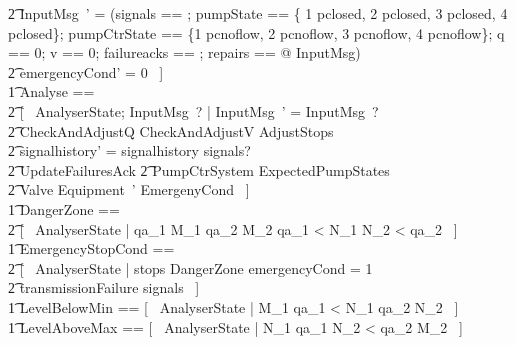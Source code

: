 \documentclass{report} %
\begin{document}
\begin{circus}
        \t2 \theta InputMsg~' = (\LET signals == \emptyset[InputSignal]; pumpState == \{ 1 \mapsto pclosed, 2 \mapsto pclosed, 3 \mapsto pclosed, 4 \mapsto pclosed\}; pumpCtrState == \{1 \mapsto pcnoflow, 2 \mapsto pcnoflow, 3 \mapsto pcnoflow, 4 \mapsto pcnoflow\}; q == 0; v == 0; failureacks == \emptyset[UnitFailure]; repairs == \emptyset[UnitFailure] @ \theta InputMsg) \\
        \t2 \land emergencyCond' = 0 ~] \\
    \t1 Analyse == \\
        \t2 [~ \Delta AnalyserState; InputMsg~? | \theta InputMsg~' = \theta InputMsg~? \land \\
        \t2 CheckAndAdjustQ \land CheckAndAdjustV \land AdjustStops \land \\
        \t2 signalhistory' = signalhistory \cup signals? \land \\
        \t2 UpdateFailuresAck \land 
        \t2 \Xi PumpCtrSystem \land \Xi ExpectedPumpStates \land \\ %
        \t2 \Xi Valve \land Equipment~' \land \Xi EmergenyCond ~] \\
    \t1 DangerZone == \\
        \t2 [~ AnalyserState | qa\_1 \geq M\_1 \land qa\_2 \leq M\_2 \implies qa\_1 < N\_1 \land N\_2 < qa\_2 ~] \\ %
    \t1 EmergencyStopCond == \\
        \t2 [~ AnalyserState | stops  \lor DangerZone \lor emergencyCond = 1 \lor \\
            \t2 transmissionFailure \in signals ~] \\
    \t1 LevelBelowMin == [~ AnalyserState | M\_1 \leq qa\_1 < N\_1 \land qa\_2 \leq N\_2 ~] \\
    \t1 LevelAboveMax == [~ AnalyserState | N\_1 \leq qa\_1 \land N\_2 < qa\_2 \leq M\_2 ~] \\

\end{circus}
\end{document}
